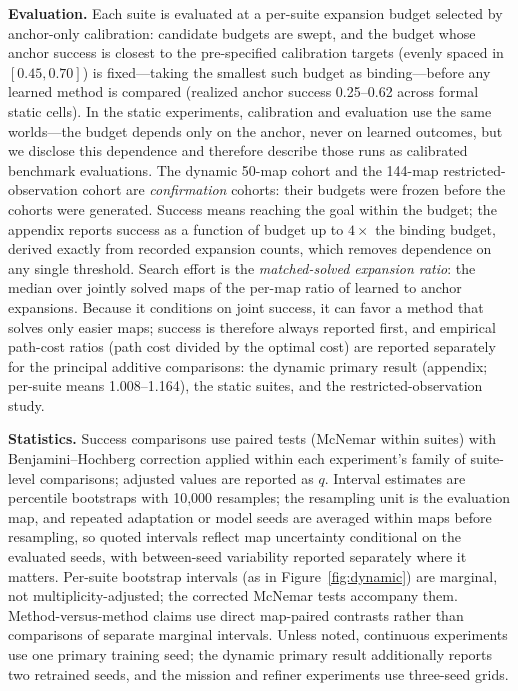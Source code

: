 \documentclass[letterpaper]{article} %
\begin{document}
\textbf{Evaluation.} Each suite is evaluated at a per-suite expansion budget selected by anchor-only calibration: candidate budgets are swept, and the budget whose anchor success is closest to the pre-specified calibration targets (evenly spaced in $[0.45, 0.70]$) is fixed---taking the smallest such budget as binding---before any learned method is compared (realized anchor success 0.25--0.62 across formal static cells). In the static experiments, calibration and evaluation use the same worlds---the budget depends only on the anchor, never on learned outcomes, but we disclose this dependence and therefore describe those runs as calibrated benchmark evaluations. The dynamic 50-map cohort and the 144-map restricted-observation cohort are \emph{confirmation} cohorts: their budgets were frozen before the cohorts were generated. Success means reaching the goal within the budget; the appendix reports success as a function of budget up to $4\times$ the binding budget, derived exactly from recorded expansion counts, which removes dependence on any single threshold. Search effort is the \emph{matched-solved expansion ratio}: the median over jointly solved maps of the per-map ratio of learned to anchor expansions. Because it conditions on joint success, it can favor a method that solves only easier maps; success is therefore always reported first, and empirical path-cost ratios (path cost divided by the optimal cost) are reported separately for the principal additive comparisons: the dynamic primary result (appendix; per-suite means 1.008--1.164), the static suites, and the restricted-observation study.

\textbf{Statistics.} Success comparisons use paired tests (McNemar within suites) with Benjamini--Hochberg correction applied within each experiment's family of suite-level comparisons; adjusted values are reported as $q$. Interval estimates are percentile bootstraps with 10{,}000 resamples; the resampling unit is the evaluation map, and repeated adaptation or model seeds are averaged within maps before resampling, so quoted intervals reflect map uncertainty conditional on the evaluated seeds, with between-seed variability reported separately where it matters. Per-suite bootstrap intervals (as in Figure~\ref{fig:dynamic}) are marginal, not multiplicity-adjusted; the corrected McNemar tests accompany them. Method-versus-method claims use direct map-paired contrasts rather than comparisons of separate marginal intervals. Unless noted, continuous experiments use one primary training seed; the dynamic primary result additionally reports two retrained seeds, and the mission and refiner experiments use three-seed grids.
\end{document}
